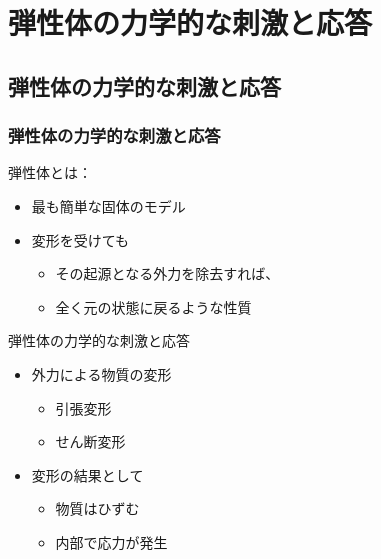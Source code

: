 \documentclass[12pt, dvipdfmx]{beamer}
\begin{document}
\section{弾性体の力学的な刺激と応答}
\subsection{弾性体の力学的な刺激と応答}
\begin{frame}
	\frametitle{弾性体の力学的な刺激と応答}
		\begin{exampleblock}{弾性体とは：}
			\begin{itemize}
				\item 最も簡単な固体のモデル
				\item 変形を受けても
				\begin{itemize}
					\item その起源となる外力を除去すれば、
					\item 全く元の状態に戻るような性質
				\end{itemize}
			\end{itemize}
		\end{exampleblock}		
		\begin{block}{弾性体の力学的な刺激と応答}
			\begin{itemize}
				\item 外力による物質の変形
				\begin{itemize}
					\item 引張変形
					\item せん断変形
				\end{itemize}
				\item 変形の結果として
				\begin{itemize}
					\item 物質はひずむ
					\item 内部で応力が発生
				\end{itemize}
			\end{itemize}
		\end{block}
\end{frame}
\end{document}
